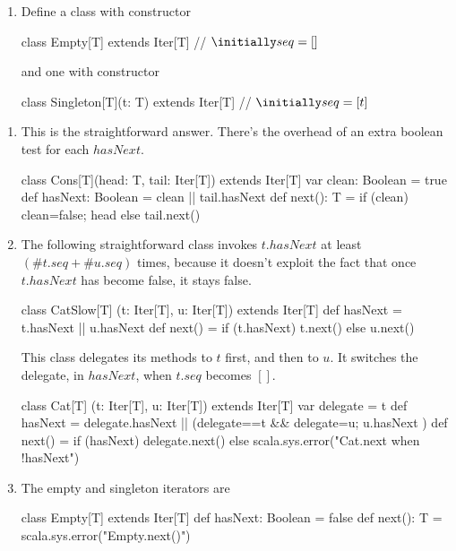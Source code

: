 \documentclass{ip3}
\begin{document}
\begin{foil}
\begin{exercise}
\begin{enumerate}
\item Define a class with constructor
\begin{scala}
        class Empty[T] extends Iter[T]
        // $\initially seq = []$
\end{scala}
and one with constructor
\begin{scala}
        class Singleton[T](t: T) extends Iter[T]
        // $\initially seq = [t]$
\end{scala}
\end{enumerate}
\begin{answer}
\begin{enumerate}
\item This is the straightforward answer. There's the overhead of an extra
boolean test for each $hasNext$.
\begin{-code}
class Cons[T](head: T, tail: Iter[T]) extends Iter[T]
{ var clean:   Boolean = true
  def hasNext: Boolean = clean || tail.hasNext
  def next():  T       =
      { if (clean) { clean=false; head } else tail.next() }
} 
\end{-code}

\item The following straightforward class invokes $t.hasNext$ at least 
$(\#t.seq+\#u.seq)$ times, because it doesn't exploit the fact that
once $t.hasNext$ has become false, it stays false.
\begin{code}
class CatSlow[T]  (t: Iter[T],   u: Iter[T]) extends Iter[T] {
    def hasNext = t.hasNext || u.hasNext
    def next()  = if (t.hasNext) t.next() else u.next()
}
\end{code}

This class delegates its methods to $t$ first, and then to $u$. It
switches the delegate, in $hasNext$, when $t.seq$ becomes $[]$. 
\begin{-code}
class Cat[T]  (t: Iter[T],   u: Iter[T]) extends Iter[T] {
    var delegate = t
    def hasNext  = delegate.hasNext || (delegate==t && { delegate=u; u.hasNext })
    def next()   = 
        if (hasNext) delegate.next() 
        else 
           scala.sys.error("Cat.next when !hasNext")
}
\end{-code}

\item The empty and singleton iterators are
\begin{-code}
        class Empty[T] extends Iter[T] {
           def hasNext: Boolean = false
           def next():  T       = scala.sys.error("Empty.next()")
        } 
\end{-code}


\end{enumerate}
\end{answer}
\end{exercise}
\end{foil}
\end{document}
